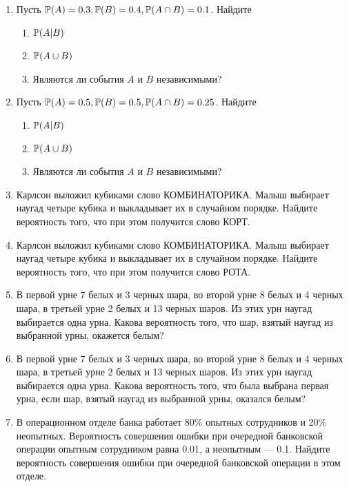 \begin{enumerate}
\item  Пусть $\P(A) = 0.3, \P(B) = 0.4, \P(A\cap B) = 0.1 $. Найдите
	\begin{enumerate}
		\item  $\P(A|B)$
		\item  $\P(A\cup B)$
		\item  Являются ли события $A$ и $B$ независимыми?
	\end{enumerate}



\item  Пусть $\P(A) = 0.5, \P(B) = 0.5, \P(A\cap B) = 0.25 $. Найдите
\begin{enumerate}
	\item  $\P(A|B)$
	\item  $\P(A\cup B)$
	\item  Являются ли события $A$ и $B$ независимыми?
\end{enumerate}



\item  Карлсон выложил кубиками слово КОМБИНАТОРИКА. Малыш выбирает наугад четыре кубика и выкладывает их в случайном порядке.
Найдите вероятность того, что при этом получится слово КОРТ.


\item  Карлсон выложил кубиками слово КОМБИНАТОРИКА. Малыш выбирает наугад четыре кубика и выкладывает их в случайном порядке.
Найдите вероятность того, что при этом получится слово РОТА.

\item  В первой урне 7 белых и 3 черных шара, во второй урне 8 белых и 4 черных
шара, в третьей урне 2 белых и 13 черных шаров. Из этих урн наугад выбирается одна урна. Какова вероятность того, что шар, взятый наугад из выбранной урны, окажется белым?


\item  В первой урне 7 белых и 3 черных шара, во второй урне 8 белых и 4 черных
шара, в третьей урне 2 белых и 13 черных шаров. Из этих урн наугад выбирается одна урна. Какова вероятность того, что была выбрана первая урна, если шар, взятый наугад из выбранной урны, оказался белым?


\item  В операционном отделе банка работает 80\% опытных сотрудников и 20\%
неопытных. Вероятность совершения ошибки при очередной банковской операции
опытным сотрудником равна 0.01, а неопытным — 0.1. Найдите вероятность совершения ошибки при очередной банковской операции в этом отделе.



\end{enumerate}
